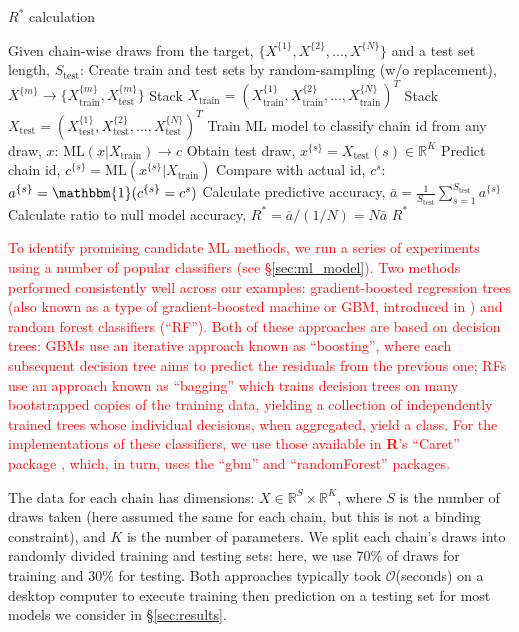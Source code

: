 \documentclass{article}
\begin{document}
\begin{algorithm}[tb]
	\caption{$R^*$ calculation}
	\label{alg:R_star}
	\begin{algorithmic}
		\STATE Given chain-wise draws from the target, $\{X^{\{1\}},X^{\{2\}},...,X^{\{N\}}\}$ and a test set length, $S_\text{test}$:
		\STATE Create train and test sets by random-sampling (w/o replacement), $X^{\{m\}}\rightarrow\{X^{\{m\}}_\text{train},X^{\{m\}}_\text{test}\}$
		\ENDFOR
		\STATE Stack $X_\text{train} = (X^{\{1\}}_\text{train},X^{\{2\}}_\text{train},...,X^{\{N\}}_\text{train})^T$
		\STATE Stack $X_\text{test} = (X^{\{1\}}_\text{test},X^{\{2\}}_\text{test},...,X^{\{N\}}_\text{test})^T$
		\STATE Train ML model to classify chain id from any draw, $x$: $\text{ML}(x|X_\text{train}) \rightarrow c$
		\STATE Obtain test draw, $x^{\{s\}}=X_\text{test}(s)\in \mathbb{R}^K$
		\STATE Predict chain id, $c^{\{s\}} = \text{ML}(x^{\{s\}}|X_\text{train})$
		\STATE Compare with actual id, $c^s$: $a^{\{s\}}=\mathbbm{1}(c^{\{s\}}=c^s)$
		\ENDFOR
		\STATE Calculate predictive accuracy, $\bar{a} = \frac{1}{S_\text{test}} \sum_{s=1}^{S_\text{test}} a^{\{s\}}$
		\STATE Calculate ratio to null model accuracy, $R^* = \bar{a} / (1 / N) = N \bar{a}$
		\RETURN $R^*$
	\end{algorithmic}
\end{algorithm}

\textcolor{red}{To identify promising candidate ML methods, we run a series of experiments using a number of popular classifiers (see \S\ref{sec:ml_model}). Two methods performed consistently well across our examples: gradient-boosted regression trees (also known as a type of gradient-boosted machine or GBM, introduced in \cite{friedman2001greedy}) and random forest classifiers \citep{breiman2001random} (``RF''). Both of these approaches are based on decision trees: GBMs use an iterative approach known as ``boosting'', where each subsequent decision tree aims to predict the residuals from the previous one; RFs use an approach known as ``bagging'' which trains decision trees on many bootstrapped copies of the training data, yielding a collection of independently trained trees whose individual decisions, when aggregated, yield a class. For the implementations of these classifiers, we use those available in \textbf{\textsf{R}}'s ``Caret'' package \citep{kuhn2008building}, which, in turn, uses the ``gbm'' \citep{greenwell2019package} and ``randomForest'' \citep{liaw2002classification} packages.}

The data for each chain has dimensions: $X\in \mathbb{R}^{S}\times \mathbb{R}^{K}$, where $S$ is the number of draws taken (here assumed the same for each chain, but this is not a binding constraint), and $K$ is the number of parameters. We split each chain's draws into randomly divided training and testing sets: here, we use 70\% of draws for training and 30\% for testing. Both approaches typically took $\mathcal{O}$(seconds) on a desktop computer to execute training then prediction on a testing set for most models we consider in \S\ref{sec:results}.
\end{document}
